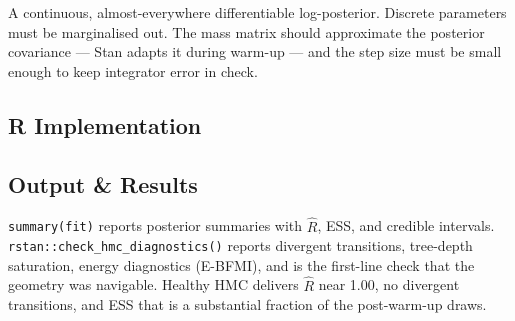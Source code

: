 \documentclass[
]{article}
\newenvironment{Shaded}{\begin{snugshade}}{\end{snugshade}}
\newcommand{\AttributeTok}[1]{\textcolor[rgb]{0.13,0.29,0.53}{#1}}
\newcommand{\CommentTok}[1]{\textcolor[rgb]{0.56,0.35,0.01}{\textit{#1}}}
\newcommand{\DecValTok}[1]{\textcolor[rgb]{0.00,0.00,0.81}{#1}}
\newcommand{\FloatTok}[1]{\textcolor[rgb]{0.00,0.00,0.81}{#1}}
\newcommand{\FunctionTok}[1]{\textcolor[rgb]{0.13,0.29,0.53}{\textbf{#1}}}
\newcommand{\NormalTok}[1]{#1}
\newcommand{\OtherTok}[1]{\textcolor[rgb]{0.56,0.35,0.01}{#1}}
\newcommand{\SpecialCharTok}[1]{\textcolor[rgb]{0.81,0.36,0.00}{\textbf{#1}}}
\begin{document}
A continuous, almost-everywhere differentiable log-posterior. Discrete
parameters must be marginalised out. The mass matrix should approximate
the posterior covariance --- Stan adapts it during warm-up --- and the
step size must be small enough to keep integrator error in check.

\subsection{R Implementation}\label{r-implementation}

\begin{Shaded}
\end{Shaded}

\subsection{Output \& Results}\label{output-results}

\texttt{summary(fit)} reports posterior summaries with \(\hat R\), ESS,
and credible intervals. \texttt{rstan::check\_hmc\_diagnostics()}
reports divergent transitions, tree-depth saturation, energy diagnostics
(E-BFMI), and is the first-line check that the geometry was navigable.
Healthy HMC delivers \(\hat R\) near 1.00, no divergent transitions, and
ESS that is a substantial fraction of the post-warm-up draws.
\end{document}
